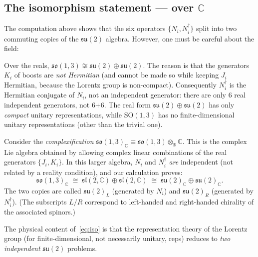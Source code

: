 \subsection{The isomorphism statement --- over \texorpdfstring{$\mathbb{C}$}{C}}

The computation above shows that the six operators
$\{N_i, N_i^\dagger\}$ split into two commuting copies of the
$\mathfrak{su}(2)$ algebra.  However, one must be careful about the field:

\begin{remark}
  Over the reals, $\mathfrak{so}(1,3) \not\cong \mathfrak{su}(2)\oplus\mathfrak{su}(2)$.
  The reason is that the generators $K_i$ of boosts are \emph{not Hermitian}
  (and cannot be made so while keeping $J_i$ Hermitian, because the Lorentz
  group is non-compact).  Consequently $N_i^\dagger$ is the Hermitian
  conjugate of $N_i$, not an independent generator: there are only 6
  real independent generators, not 6+6.
  The real form $\mathfrak{su}(2)\oplus\mathfrak{su}(2)$ has only
  \emph{compact} unitary representations, while $\mathrm{SO}(1,3)$ has
  no finite-dimensional unitary representations (other than the trivial one).
\end{remark}

\begin{remark}
  Consider the \emph{complexification}
  $\mathfrak{so}(1,3)_\mathbb{C} \equiv \mathfrak{so}(1,3)\otimes_\mathbb{R}\mathbb{C}$.
  This is the complex Lie algebra obtained by allowing complex linear combinations
  of the real generators $\{J_i, K_i\}$.  In this larger algebra, $N_i$ and
  $N_i^\dagger$ \emph{are} independent (not related by a reality condition),
  and our calculation proves:
  \begin{equation}
    \mathfrak{so}(1,3)_\mathbb{C}
    \;\cong\;
    \mathfrak{sl}(2,\mathbb{C}) \oplus \mathfrak{sl}(2,\mathbb{C})
    \;\cong\;
    \mathfrak{su}(2)_\mathbb{C} \oplus \mathfrak{su}(2)_\mathbb{C}.
    \label{eq:iso}
  \end{equation}
  The two copies are called $\mathfrak{su}(2)_L$ (generated by $N_i$) and
  $\mathfrak{su}(2)_R$ (generated by $N_i^\dagger$).
  (The subscripts $L/R$ correspond to left-handed and right-handed chirality
  of the associated spinors.)
\end{remark}

The physical content of~\eqref{eq:iso} is that the representation theory
of the Lorentz group (for finite-dimensional, not necessarily unitary, reps)
reduces to \emph{two independent} $\mathfrak{su}(2)$ problems.

